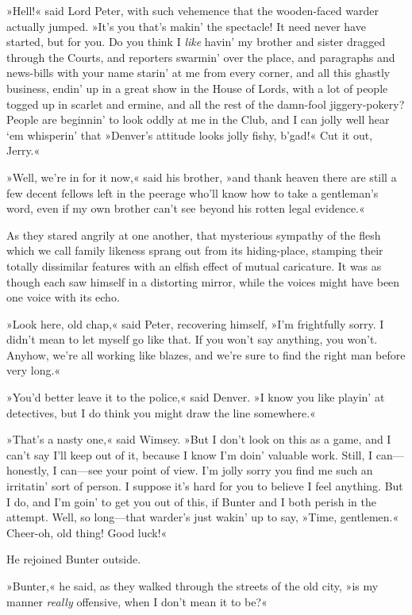 »Hell!« said Lord Peter, with such vehemence that the wooden-faced warder actually jumped. »It's you that's makin' the spectacle! It need never have started, but for you. Do you think I \textit{like} havin' my brother and sister dragged through the Courts, and reporters swarmin' over the place, and paragraphs and news-bills with your name starin' at me from every corner, and all this ghastly business, endin' up in a great show in the House of Lords, with a lot of people togged up in scarlet and ermine, and all the rest of the damn-fool jiggery-pokery? People are beginnin' to look oddly at me in the Club, and I can jolly well hear `em whisperin' that »Denver's attitude looks jolly fishy, b'gad!« Cut it out, Jerry.«

»Well, we're in for it now,« said his brother, »and thank heaven there are still a few decent fellows left in the peerage who'll know how to take a gentleman's word, even if my own brother can't see beyond his rotten legal evidence.«

As they stared angrily at one another, that mysterious sympathy of the flesh which we call family likeness sprang out from its hiding-place, stamping their totally dissimilar features with an elfish effect of mutual caricature. It was as though each saw himself in a distorting mirror, while the voices might have been one voice with its echo.

»Look here, old chap,« said Peter, recovering himself, »I'm frightfully sorry. I didn't mean to let myself go like that. If you won't say anything, you won't. Anyhow, we're all working like blazes, and we're sure to find the right man before very long.«

»You'd better leave it to the police,« said Denver. »I know you like playin' at detectives, but I do think you might draw the line somewhere.«

»That's a nasty one,« said Wimsey. »But I don't look on this as a game, and I can't say I'll keep out of it, because I know I'm doin' valuable work. Still, I can—honestly, I can—see your point of view. I'm jolly sorry you find me such an irritatin' sort of person. I suppose it's hard for you to believe I feel anything. But I do, and I'm goin' to get you out of this, if Bunter and I both perish in the attempt. Well, so long—that warder's just wakin' up to say, »Time, gentlemen.« Cheer-oh, old thing! Good luck!«

He rejoined Bunter outside.

»Bunter,« he said, as they walked through the streets of the old city, »is my manner \textit{really} offensive, when I don't mean it to be?«

